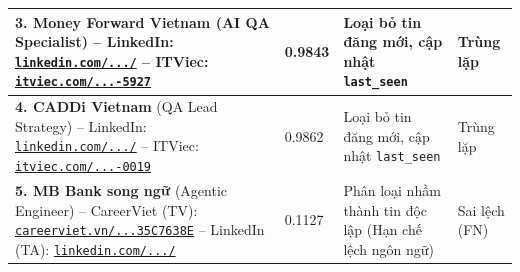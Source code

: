 \begin{table}[H]
\begin{center}
{\begin{tabular}{|L{5.5cm}|C{1.6cm}|L{4.2cm}|C{1.6cm}|}
\textbf{3. Money Forward Vietnam} (AI QA Specialist) \newline
-- LinkedIn: \href{https://www.linkedin.com/jobs/view/4416443434/}{\footnotesize\texttt{linkedin.com/\allowbreak.../}} \newline
-- ITViec: \href{https://itviec.com/it-jobs/ai-qa-data-quality-specialist-hybrid-qa-money-forward-vietnam-co-ltd-5927}{\footnotesize\texttt{itviec.com/\allowbreak...-5927}} & 0.9843 & Loại bỏ tin đăng mới, cập nhật \texttt{last\_seen} & Trùng lặp \\
\hline
\textbf{4. CADDi Vietnam} (QA Lead Strategy) \newline
-- LinkedIn: \href{https://www.linkedin.com/jobs/view/4432560618/}{\footnotesize\texttt{linkedin.com/\allowbreak.../}} \newline
-- ITViec: \href{https://itviec.com/it-jobs/qa-lead-tester-agile-english-caddi-vietnam-co-ltd-0019}{\footnotesize\texttt{itviec.com/\allowbreak...-0019}} & 0.9862 & Loại bỏ tin đăng mới, cập nhật \texttt{last\_seen} & Trùng lặp \\
\hline
\textbf{5. MB Bank song ngữ} (Agentic Engineer) \newline
-- CareerViet (TV): \href{https://careerviet.vn/vi/tim-viec-lam/agentic-engineer-python-go-c-c-backend-ai-agents-khoi-cong-nghe-thong-tin-2026td450887.35C7638E.html}{\footnotesize\texttt{careerviet.vn/\allowbreak...35C7638E}} \newline
-- LinkedIn (TA): \href{https://www.linkedin.com/jobs/view/4442013085/}{\footnotesize\texttt{linkedin.com/\allowbreak.../}} & 0.1127 & Phân loại nhầm thành tin độc lập (Hạn chế lệch ngôn ngữ) & Sai lệch (FN) \\
\hline
\end{tabular}}
\end{center}
\end{table}

\begin{table}[H]
\caption{Kết quả đánh giá chất lượng thuật toán khử trùng lặp bài đăng}
\label{tab:eval_dedup}
\begin{center}
\setlength{\tabcolsep}{6pt}
\end{center}
\end{table}

